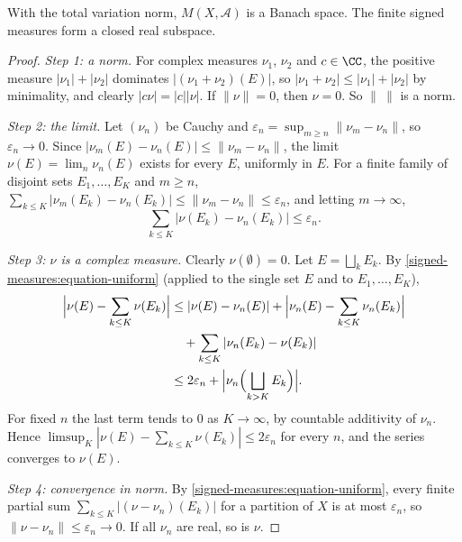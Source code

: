 \begin{proposition}\label{signed-measures:proposition-banach}
With the total variation norm, $M(X, \mathcal{A})$ is a Banach space. The finite signed measures form a closed real subspace.
\end{proposition}

\begin{proof}
\emph{Step 1: a norm.} For complex measures $\nu_1$, $\nu_2$ and $c \in \CC$, the positive measure $|\nu_1| + |\nu_2|$ dominates $|(\nu_1 + \nu_2)(E)|$, so $|\nu_1 + \nu_2| \leq |\nu_1| + |\nu_2|$ by
minimality, and clearly $|c\nu| = |c||\nu|$. If $\|\nu\| = 0$, then $\nu = 0$. So $\|\ \|$ is a norm.

\emph{Step 2: the limit.} Let $(\nu_n)$ be Cauchy and $\varepsilon_n = \sup_{m \geq n}\|\nu_m - \nu_n\|$, so $\varepsilon_n \to 0$. Since $|\nu_m(E) - \nu_n(E)| \leq \|\nu_m - \nu_n\|$, the limit
$\nu(E) = \lim_n\nu_n(E)$ exists for every $E$, uniformly in $E$. For a finite family of disjoint sets $E_1, \ldots, E_K$ and $m \geq n$,
$\sum_{k \leq K}|\nu_m(E_k) - \nu_n(E_k)| \leq \|\nu_m - \nu_n\| \leq \varepsilon_n$, and letting $m \to \infty$,
\begin{equation}\label{signed-measures:equation-uniform}
\sum_{k \leq K}|\nu(E_k) - \nu_n(E_k)| \leq \varepsilon_n .
\end{equation}

\emph{Step 3: $\nu$ is a complex measure.} Clearly $\nu(\emptyset) = 0$. Let $E = \bigsqcup_kE_k$. By \eqref{signed-measures:equation-uniform} (applied to the single set $E$ and to $E_1, \ldots, E_K$),
\[\begin{aligned}
\Bigl|\nu(E) - \sum_{k \leq K}\nu(E_k)\Bigr| &\leq |\nu(E) - \nu_n(E)| + \Bigl|\nu_n(E) - \sum_{k \leq K}\nu_n(E_k)\Bigr| \\
&\quad + \sum_{k \leq K}|\nu_n(E_k) - \nu(E_k)| \\
&\leq 2\varepsilon_n + \Bigl|\nu_n\Bigl(\bigsqcup_{k > K}E_k\Bigr)\Bigr| .
\end{aligned}\]
For fixed $n$ the last term tends to $0$ as $K \to \infty$, by countable additivity of $\nu_n$. Hence $\limsup_K|\nu(E) - \sum_{k \leq K}\nu(E_k)| \leq 2\varepsilon_n$ for every $n$, and the series
converges to $\nu(E)$.

\emph{Step 4: convergence in norm.} By \eqref{signed-measures:equation-uniform}, every finite partial sum $\sum_{k \leq K}|(\nu - \nu_n)(E_k)|$ for a partition of $X$ is at most $\varepsilon_n$, so
$\|\nu - \nu_n\| \leq \varepsilon_n \to 0$. If all $\nu_n$ are real, so is $\nu$.
\end{proof}

